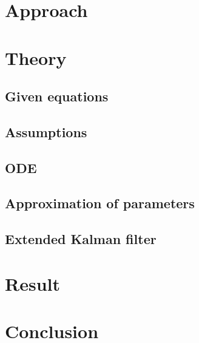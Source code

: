 \documentclass[12pt,a4paper]{article}
\begin{document}
\section{Approach}


\section{Theory}
\subsection{Given equations}


\subsection{Assumptions}


\subsection{ODE}


\subsection{Approximation of parameters}


\subsection{Extended Kalman filter}


%

\section{Result}


\section{Conclusion}


{}

\end{document}
